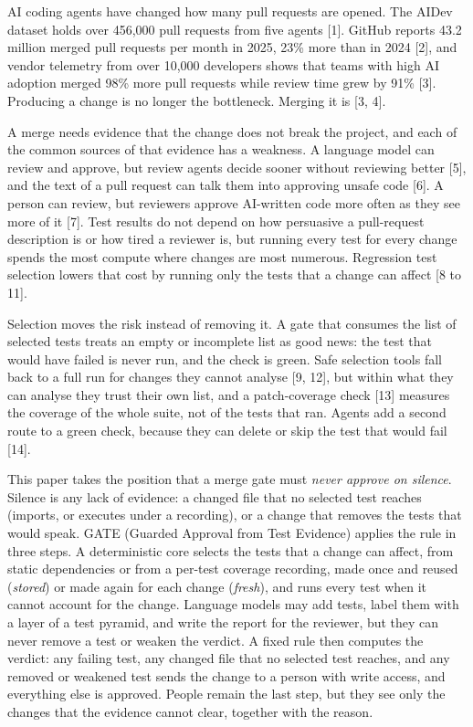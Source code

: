 \documentclass[conference]{IEEEtran}
\begin{document}
AI coding agents have changed how many pull requests are opened. The AIDev dataset holds over 456,000 pull requests from five agents {[}1{]}. GitHub reports 43.2 million merged pull requests per month in 2025, 23\% more than in 2024 {[}2{]}, and vendor telemetry from over 10,000 developers shows that teams with high AI adoption merged 98\% more pull requests while review time grew by 91\% {[}3{]}. Producing a change is no longer the bottleneck. Merging it is {[}3, 4{]}.

A merge needs evidence that the change does not break the project, and each of the common sources of that evidence has a weakness. A language model can review and approve, but review agents decide sooner without reviewing better {[}5{]}, and the text of a pull request can talk them into approving unsafe code {[}6{]}. A person can review, but reviewers approve AI-written code more often as they see more of it {[}7{]}. Test results do not depend on how persuasive a pull-request description is or how tired a reviewer is, but running every test for every change spends the most compute where changes are most numerous. Regression test selection lowers that cost by running only the tests that a change can affect {[}8 to 11{]}.

Selection moves the risk instead of removing it. A gate that consumes the list of selected tests treats an empty or incomplete list as good news: the test that would have failed is never run, and the check is green. Safe selection tools fall back to a full run for changes they cannot analyse {[}9, 12{]}, but within what they can analyse they trust their own list, and a patch-coverage check {[}13{]} measures the coverage of the whole suite, not of the tests that ran. Agents add a second route to a green check, because they can delete or skip the test that would fail {[}14{]}.

This paper takes the position that a merge gate must \emph{never approve on silence}. Silence is any lack of evidence: a changed file that no selected test reaches (imports, or executes under a recording), or a change that removes the tests that would speak. GATE (Guarded Approval from Test Evidence) applies the rule in three steps. A deterministic core selects the tests that a change can affect, from static dependencies or from a per-test coverage recording, made once and reused (\emph{stored}) or made again for each change (\emph{fresh}), and runs every test when it cannot account for the change. Language models may add tests, label them with a layer of a test pyramid, and write the report for the reviewer, but they can never remove a test or weaken the verdict. A fixed rule then computes the verdict: any failing test, any changed file that no selected test reaches, and any removed or weakened test sends the change to a person with write access, and everything else is approved. People remain the last step, but they see only the changes that the evidence cannot clear, together with the reason.
\end{document}
